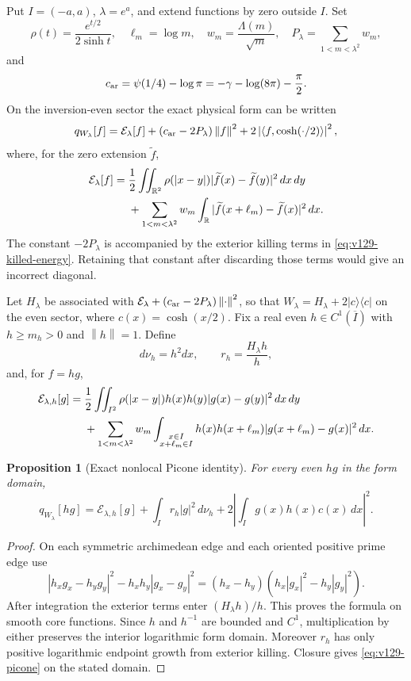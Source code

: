 \documentclass[11pt]{article}
\newtheorem{proposition}[theorem]{Proposition}
\theoremstyle{remark}
\newcommand{\norm}[1]{\left\lVert #1\right\rVert}
\newcommand{\ip}[2]{\left\langle #1,#2\right\rangle}
\begin{document}
Put $I=(-a,a)$, $\lambda=e^a$, and extend functions by zero outside
$I$. Set
\[
 \rho(t)=\frac{e^{t/2}}{2\sinh t},\quad
 \ell_m=\log m,\quad w_m=\frac{\Lambda(m)}{\sqrt m},\quad
 P_\lambda=\sum_{1<m<\lambda^2}w_m,
\]
and
\[
 c_{\rm ar}=\psi(1/4)-\log\pi
 =-\gamma-\log(8\pi)-\frac\pi2.
\]
On the inversion-even sector the exact physical form can be written
\begin{equation}\label{eq:v129-jump-decomposition}
 q_{W_\lambda}[f]=\mathcal E_\lambda[f]
 +(c_{\rm ar}-2P_\lambda)\norm f^2
 +2\left|\ip f{\cosh(\cdot/2)}\right|^2,
\end{equation}
where, for the zero extension $\widetilde f$,
\begin{align}
 \mathcal E_\lambda[f]
 ={}&\frac12\iint_{\mathbb R^2}\rho(|x-y|)
       |\widetilde f(x)-\widetilde f(y)|^2\,dx\,dy \notag\\
 &+\sum_{1<m<\lambda^2}w_m\int_{\mathbb R}
       |\widetilde f(x+\ell_m)-\widetilde f(x)|^2\,dx .
 \label{eq:v129-killed-energy}
\end{align}
The constant $-2P_\lambda$ is accompanied by the exterior killing
terms in \eqref{eq:v129-killed-energy}. Retaining that constant after
discarding those terms would give an incorrect diagonal.

Let $H_\lambda$ be associated with
$\mathcal E_\lambda+(c_{\rm ar}-2P_\lambda)\norm{\cdot}^2$, so that
$W_\lambda=H_\lambda+2|c\rangle\langle c|$ on the even sector, where
$c(x)=\cosh(x/2)$. Fix a real even $h\in C^1(\overline I)$ with
$h\ge m_h>0$ and $\norm h=1$. Define
\[
 d\nu_h=h^2dx,\qquad r_h=\frac{H_\lambda h}{h},
\]
and, for $f=hg$,
\begin{align}
 \mathcal E_{\lambda,h}[g]
 ={}&\frac12\iint_{I^2}\rho(|x-y|)h(x)h(y)
                |g(x)-g(y)|^2\,dx\,dy \notag\\
 &+\sum_{1<m<\lambda^2}w_m
   \int_{\substack{x\in I\\x+\ell_m\in I}}
       h(x)h(x+\ell_m)|g(x+\ell_m)-g(x)|^2\,dx .
 \label{eq:v129-transformed-energy}
\end{align}

\begin{proposition}[Exact nonlocal Picone identity]
\label{prop:v129-picone}
For every even $hg$ in the form domain,
\begin{equation}\label{eq:v129-picone}
 q_{W_\lambda}[hg]=\mathcal E_{\lambda,h}[g]
 +\int_I r_h|g|^2\,d\nu_h
 +2\left|\int_I g(x)h(x)c(x)\,dx\right|^2.
\end{equation}
\end{proposition}
\begin{proof}
On each symmetric archimedean edge and each oriented positive prime
edge use
\[
 |h_xg_x-h_yg_y|^2-h_xh_y|g_x-g_y|^2
 =(h_x-h_y)(h_x|g_x|^2-h_y|g_y|^2).
\]
After integration the exterior terms enter $(H_\lambda h)/h$. This
proves the formula on smooth core functions. Since $h$ and $h^{-1}$
are bounded and $C^1$, multiplication by either preserves the interior
logarithmic form domain. Moreover $r_h$ has only positive logarithmic
endpoint growth from exterior killing. Closure gives
\eqref{eq:v129-picone} on the stated domain.
\end{proof}
\end{document}
